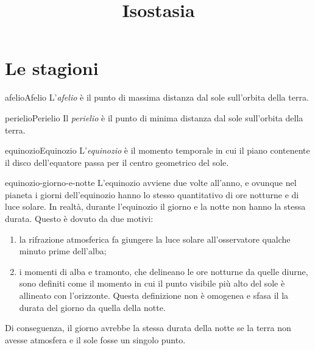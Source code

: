 \documentclass[preview]{standalone}
\begin{document}
\title{Isostasia}
\genpage

\section{Le stagioni}


\begin{snippetdefinition}{afelio}{Afelio}
    L'\textit{afelio} è il punto di massima distanza dal sole sull'orbita
    della terra.
\end{snippetdefinition}

\begin{snippetdefinition}{perielio}{Perielio}
    Il \textit{perielio} è il punto di minima distanza dal sole sull'orbita
    della terra.
\end{snippetdefinition}


\begin{snippetdefinition}{equinozio}{Equinozio}
    L'\textit{equinozio} è il momento temporale in
    cui il piano contenente il disco dell'equatore
    passa per il centro geometrico del sole.
\end{snippetdefinition}

\begin{snippet}{equinozio-giorno-e-notte}
    L'equinozio avviene due volte all'anno, e ovunque nel pianeta i giorni dell'equinozio hanno lo stesso quantitativo di ore notturne e di luce solare.
    In realtà, durante l'equinozio il giorno e la notte non hanno la stessa durata.
    Questo è dovuto da due motivi:
    \begin{enumerate}
        \item la rifrazione atmosferica fa giungere la luce solare all'osservatore qualche minuto prime dell'alba;
        \item i momenti di alba e tramonto, che delineano le ore notturne da quelle diurne, sono definiti come il momento in cui il punto visibile più alto del sole è allineato con l'orizzonte. Questa definizione non è omogenea e sfasa il la durata del giorno da quella della notte.
    \end{enumerate}
    Di conseguenza, il giorno avrebbe la stessa durata della notte se la terra non avesse atmosfera e il sole fosse un singolo punto.
\end{snippet}
\end{document}
